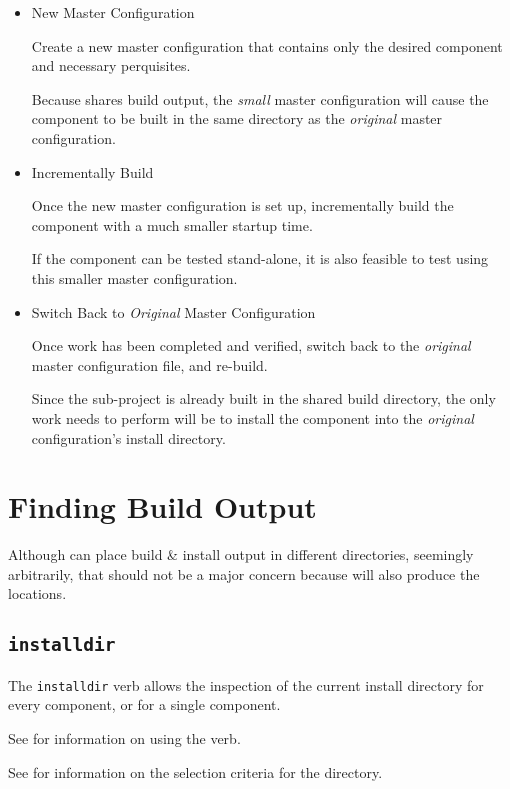 \begin{itemize}
\item New Master Configuration

  Create a new master configuration that contains only the desired
  component and necessary perquisites.

  Because \lmsbw shares build output, the \emph{small} master
  configuration will cause the component to be built in the same
  directory as the \emph{original} master configuration.

\item Incrementally Build

  Once the new master configuration is set up, incrementally build the
  component with a much smaller startup time.

  If the component can be tested stand-alone, it is also feasible to
  test using this smaller master configuration.

\item Switch Back to \emph{Original} Master Configuration

  Once work has been completed and verified, switch back to the
  \emph{original} master configuration file, and re-build.

  Since the sub-project is already built in the shared build
  directory, the only work \lmsbw needs to perform will be to install
  the component into the \emph{original} configuration's install
  directory.
\end{itemize}

\section{Finding Build Output}

Although \lmsbw can place build \& install output in different
directories, seemingly arbitrarily, that should not be a major concern
because \lmsbw will also produce the locations.

\subsection{\texttt{installdir}}

The \lmsbw \texttt{installdir} verb allows the inspection of the
current install directory for every component, or for a single
component.

See  for information on using the verb.

See  for information on the
selection criteria for the directory.

